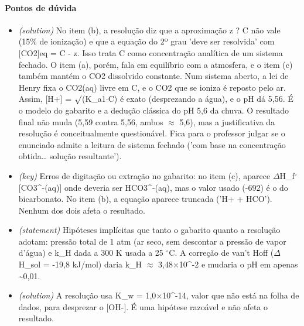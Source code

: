 \documentclass{article}%
\begin{document}
\paragraph{Pontos de dúvida}%
\begin{itemize}%
\item%
\textit{(solution)} No item (b), a resolução diz que a aproximação z ? C não vale (15\% de ionização) e que a equação do 2º grau 'deve ser resolvida' com {[}CO2{]}eq = C - z. Isso trata C como concentração analítica de um sistema fechado. O item (a), porém, fala em equilíbrio com a atmosfera, e o item (c) também mantém o CO2 dissolvido constante. Num sistema aberto, a lei de Henry fixa o CO2(aq) livre em C, e o CO2 que se ioniza é reposto pelo ar. Assim, {[}H+{]} = $\surd$(K\_a1$\cdot$C) é exato (desprezando a água), e o pH dá 5,56. É o modelo do gabarito e a dedução clássica do pH 5,6 da chuva. O resultado final não muda (5,59 contra 5,56, ambos $\approx$ 5,6), mas a justificativa da resolução é conceitualmente questionável. Fica para o professor julgar se o enunciado admite a leitura de sistema fechado ('com base na concentração obtida\ldots{} solução resultante').%
\item%
\textit{(key)} Erros de digitação ou extração no gabarito: no item (c), aparece $\Delta$H\_f$^\circ${[}CO3\^{}{-}(aq){]} onde deveria ser HCO3\^{}{-}(aq), mas o valor usado (-692) é o do bicarbonato. No item (b), a equação aparece truncada ('H+ + HCO'). Nenhum dos dois afeta o resultado.%
\item%
\textit{(statement)} Hipóteses implícitas que tanto o gabarito quanto a resolução adotam: pressão total de 1 atm (ar seco, sem descontar a pressão de vapor d'água) e k\_H dada a 300 K usada a 25 $^\circ$C. A correção de van't Hoff ($\Delta$H\_sol = -19,8 kJ/mol) daria k\_H $\approx$ 3,48$\times$10\^{}{-}2 e mudaria o pH em apenas \textasciitilde{}0,01.%
\item%
\textit{(solution)} A resolução usa K\_w = 1,0$\times$10\^{}{-}14, valor que não está na folha de dados, para desprezar o {[}OH{-}{]}. É uma hipótese razoável e não afeta o resultado.%
\end{itemize}%
\end{document}
